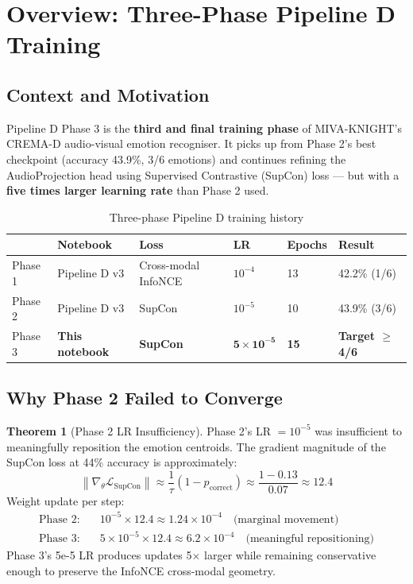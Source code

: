 \documentclass[12pt,a4paper]{article}
\theoremstyle{definition}
\newtheorem{theorem}{Theorem}[section]
\theoremstyle{remark}
\begin{document}
\tableofcontents
\newpage

\section{Overview: Three-Phase Pipeline D Training}

\subsection{Context and Motivation}

Pipeline D Phase 3 is the \textbf{third and final training phase} of
MIVA-KNIGHT's CREMA-D audio-visual emotion recogniser.
It picks up from Phase 2's best checkpoint (accuracy 43.9\%, 3/6 emotions)
and continues refining the AudioProjection head using Supervised Contrastive
(SupCon) loss — but with a \textbf{five times larger learning rate}
than Phase 2 used.

\begin{table}[H]
\centering
\caption{Three-phase Pipeline D training history}
\begin{tabularx}{\textwidth}{lXXXXX}
\toprule
& \textbf{Notebook} & \textbf{Loss} & \textbf{LR} & \textbf{Epochs} & \textbf{Result} \\
\midrule
Phase 1 & Pipeline D v3 & Cross-modal InfoNCE & $10^{-4}$ & 13 & 42.2\% (1/6) \\
Phase 2 & Pipeline D v3 & SupCon & $10^{-5}$ & 10 & 43.9\% (3/6) \\
Phase 3 & \textbf{This notebook} & \textbf{SupCon} & $\mathbf{5\times10^{-5}}$ & \textbf{15} & \textbf{Target $\geq$ 4/6} \\
\bottomrule
\end{tabularx}
\end{table}

\subsection{Why Phase 2 Failed to Converge}

\begin{theorem}[Phase 2 LR Insufficiency]
Phase 2's LR $= 10^{-5}$ was insufficient to meaningfully reposition
the emotion centroids. The gradient magnitude of the SupCon loss
at 44\% accuracy is approximately:
\[
  \left\|\nabla_\theta \mathcal{L}_{\text{SupCon}}\right\|
  \approx \frac{1}{\tau}(1 - p_{\text{correct}})
  \approx \frac{1 - 0.13}{0.07} \approx 12.4
\]
Weight update per step:
\begin{align*}
  \text{Phase 2:} & \quad 10^{-5} \times 12.4 \approx 1.24 \times 10^{-4}
    \quad\text{(marginal movement)} \\
  \text{Phase 3:} & \quad 5\times10^{-5} \times 12.4 \approx 6.2 \times 10^{-4}
    \quad\text{(meaningful repositioning)}
\end{align*}
Phase 3's 5e-5 LR produces updates 5$\times$ larger while remaining
conservative enough to preserve the InfoNCE cross-modal geometry.
\end{theorem}
\end{document}
